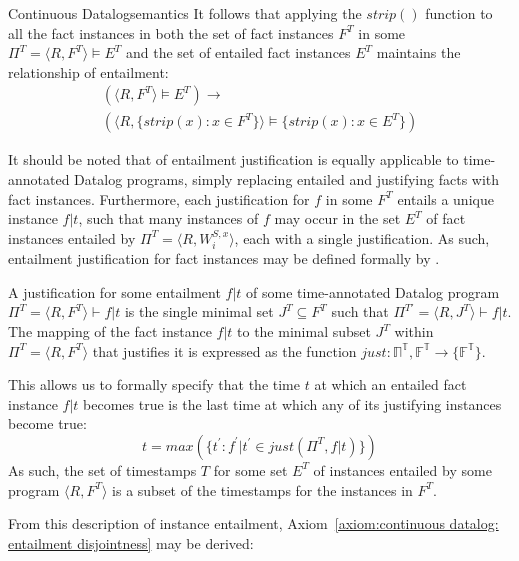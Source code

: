 \begin{nestedsection}{Continuous Datalog}{semantics}
It follows that applying the ${strip()}$ function to all the fact instances in
both the set of fact instances $F^T$ in some ${\Pi^T = \langle R, F^T \rangle \vDash E^T}$
and the set of entailed fact instances $E^T$ maintains the relationship of entailment:
\begin{multline*}
	\left( \langle R, F^T \rangle \vDash E^T \right) \rightarrow \\
		\left( \langle R, \{ strip(x) : x \in F^T \} \rangle \vDash \{ strip(x) : x \in E^T \} \right)
\end{multline*}

It should be noted that  of entailment
justification is equally applicable to time-annotated Datalog programs,
simply replacing entailed and justifying facts with fact instances.
Furthermore, each justification for $f$ in some $F^T$ entails a unique
instance ${f | t}$, such that many instances of $f$ may occur in the set
$E^T$ of fact instances entailed by
${\Pi^T = \langle R, W^{S,x}_i \rangle}$, each with a single
justification.  As such, entailment justification for fact instances may be
defined formally by .
\begin{definition}
	A justification for some entailment ${f|t}$ of some time-annotated Datalog program
	${\Pi^T = \langle R , F^T \rangle \vdash f|t}$ is the single minimal set ${J^T \subseteq F^T}$
	such that ${\Pi^{T\prime} = \langle R , J^T \rangle \vdash f|t}$.
	The mapping of the fact instance ${f | t}$ to the minimal subset $J^T$
	within ${\Pi^T = \langle R, F^T \rangle}$ that justifies it is expressed
	as the function ${just : \mathbb{\Pi^T} , \mathbb{F^T} \rightarrow \{ \mathbb{F^T} \}}$.
\end{definition}

This allows us to formally specify that the time $t$ at which an entailed fact
instance ${f | t}$ becomes true is the last time at which any of its
justifying instances become true:
\[ t = max(\{ t^\prime : f^\prime | t^\prime \in just(\Pi^T, f | t) \}) \]
As such, the set of timestamps $T$ for some set $E^T$ of instances entailed by some
program ${\langle R, F^T \rangle}$ is a subset of the timestamps for the instances in $F^T$.

From this description of instance entailment,
Axiom~\ref{axiom:continuous datalog: entailment disjointness} may be
derived:


\end{nestedsection}
